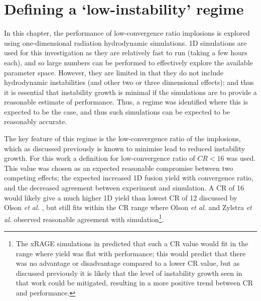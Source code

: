 

\section{Defining a `low-instability' regime}

In this chapter, the performance of low-convergence ratio implosions is explored using one-dimensional radiation hydrodynamic simulations. 1D simulations are used for this investigation as they are relatively fast to run (taking a few hours each), and so large numbers can be performed to effectively explore the available parameter space. However, they are limited in that they do not include hydrodynamic instabilities (and other two or three dimensional effects); and thus it is essential that instability growth is minimal if the simulations are to provide a reasonable estimate of performance. Thus, a regime was identified where this is expected to be the case, and thus such simulations can be expected to be reasonably accurate.

The key feature of this regime is the low-convergence ratio of the implosions, which as discussed previously is known to minimise lead to reduced instability growth. For this work a definition for low-convergence ratio of $CR<16$ was used. This value was chosen as an expected reasonable compromise between two competing effects; the expected increased 1D fusion yield with convergence ratio, and the decreased agreement between experiment and simulation. A CR of 16 would likely give a much higher 1D yield than lowest CR of 12 discussed by Olson \textit{et al.} \cite{Olson2016}, but still fits within the CR range where Olson \textit{et al.} \cite{Olson2016} and Zylstra \textit{et al.} \cite{Zylstra2018} observed reasonable agreement with simulation\footnote{ The xRAGE simulations in \cite{Haines2017a} predicted that such a CR value would fit in the range where yield was flat with performance; this would predict that there was no advantage or disadvantage compared to a lower CR value, but as discussed previously it is likely that the level of instability growth seen in that work could be mitigated, resulting in a more positive trend between CR and performance.}. 


